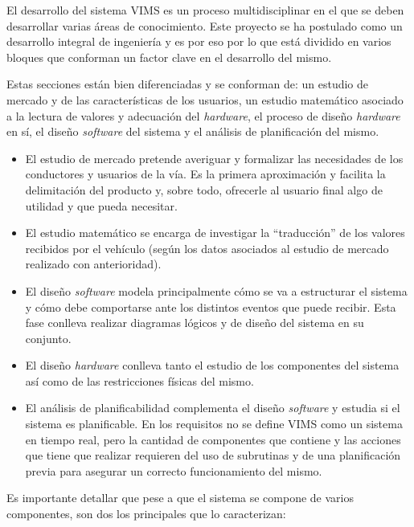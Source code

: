 El desarrollo del sistema \ac{VIMS} es un proceso multidisciplinar en el que se deben
desarrollar varias áreas de conocimiento. Este proyecto se ha postulado como
un desarrollo integral de ingeniería y es por eso por lo que está dividido en
varios bloques que conforman un factor clave en el desarrollo del mismo.

Estas secciones están bien diferenciadas y se conforman de: un estudio de mercado y de
las características de los usuarios, un estudio matemático asociado a la lectura de
valores y adecuación del \textit{hardware}, el proceso de diseño \textit{hardware}
en sí, el diseño \textit{software} del sistema y el análisis de planificación del mismo.

\begin{itemize}
  \item El estudio de mercado pretende averiguar y formalizar las necesidades de los
  conductores y usuarios de la vía. Es la primera aproximación y facilita la
  delimitación del producto y, sobre todo, ofrecerle al usuario final algo de utilidad
  y que pueda necesitar.
  \item El estudio matemático se encarga de investigar la ``traducción'' de los
  valores recibidos por el vehículo (según los datos asociados al estudio de mercado
  realizado con anterioridad).
  \item El diseño \textit{software} modela principalmente cómo se va a estructurar
  el sistema y cómo debe comportarse ante los distintos eventos que puede recibir.
  Esta fase conlleva realizar diagramas lógicos y de diseño del sistema en su conjunto.
  \item El diseño \textit{hardware} conlleva tanto el estudio de los componentes del
  sistema así como de las restricciones físicas del mismo.
  \item El análisis de planificabilidad complementa el diseño \textit{software}
  y estudia si el sistema es planificable. En los requisitos no se define \ac{VIMS}
  como un sistema en tiempo real, pero la cantidad de componentes que contiene y las
  acciones que tiene que realizar requieren del uso de subrutinas y de una planificación
  previa para asegurar un correcto funcionamiento del mismo.
\end{itemize}

Es importante detallar que pese a que el sistema se compone de varios componentes,
son dos los principales que lo caracterizan:

